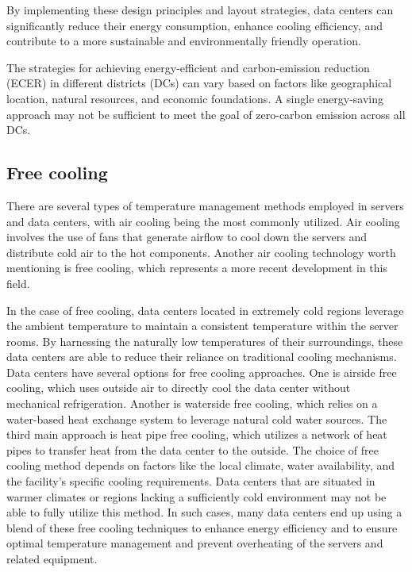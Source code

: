 \documentclass[
  a4paper,  %
  twoside,  %
  bibliography=totoc,
  headsepline,
  cleardoublepage=empty,
  parskip=half,
  draft=false
]{scrbook}
\begin{document}
By implementing these design principles and layout strategies, data centers can significantly reduce their energy consumption, enhance cooling efficiency, and contribute to a more sustainable and environmentally friendly operation.

The strategies for achieving energy-efficient and carbon-emission reduction (ECER) in different districts (DCs) can vary based on factors like geographical location, natural resources, and economic foundations. A single energy-saving approach may not be sufficient to meet the goal of zero-carbon emission across all DCs.


\subsection{Free cooling}
There are several types of temperature management methods employed in servers and data centers, with air cooling being the most commonly utilized. Air cooling involves the use of fans that generate airflow to cool down the servers and distribute cold air to the hot components. Another air cooling technology worth mentioning is free cooling\cite{data4groupCloserLook}, which represents a more recent development in this field.

In the case of free cooling, data centers located in extremely cold regions leverage the ambient temperature to maintain a consistent temperature within the server rooms\cite{data4groupCloserLook}. By harnessing the naturally low temperatures of their surroundings, these data centers are able to reduce their reliance on traditional cooling mechanisms. Data centers have several options for free cooling approaches. One is airside free cooling, which uses outside air to directly cool the data center without mechanical refrigeration. Another is waterside free cooling, which relies on a water-based heat exchange system to leverage natural cold water sources. The third main approach is heat pipe free cooling, which utilizes a network of heat pipes to transfer heat from the data center to the outside. 
The choice of free cooling method depends on factors like the local climate, water availability, and the facility's specific cooling requirements. Data centers that are situated in warmer climates or regions lacking a sufficiently cold environment may not be able to fully utilize this method. In such cases, many data centers end up using a blend of these free cooling techniques to enhance energy efficiency and to ensure optimal temperature management and prevent overheating of the servers and related equipment\cite{zhang2014free}.
\end{document}
